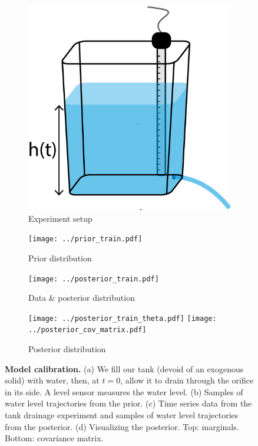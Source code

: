 \documentclass[openacc]{rsproca_new}%
\begin{document}
\begin{figure}[!ht]
    \centering
        \begin{subfigure}[b]{0.225\textwidth}
    	\includegraphics[width=\textwidth]{../tank_geometry/naked_tank.pdf}
	\caption{Experiment setup} \label{fig:naked_tank}
    \end{subfigure}
    
     \begin{subfigure}[b]{0.4\textwidth}
    	\texttt{[image: ../prior\_train.pdf]}
	\caption{Prior distribution} \label{fig:prior_train}
    \end{subfigure}
     \begin{subfigure}[b]{0.4\textwidth}
    	\texttt{[image: ../posterior\_train.pdf]}
	\caption{Data \& posterior distribution} \label{fig:posterior_train}
    \end{subfigure}
    
     \begin{subfigure}[b]{\textwidth}
     \center
    	\texttt{[image: ../posterior\_train\_theta.pdf]}
	\texttt{[image: ../posterior\_cov\_matrix.pdf]}
	\caption{Posterior distribution} \label{fig:posterior_train_theta}
    \end{subfigure}
    \caption{
      \textbf{Model calibration.}
      (a) We fill our tank (devoid of an exogenous solid) with water, then, at $t=0$, allow it to drain through the orifice in its side. A level sensor measures the water level.     
      (b) Samples of water level trajectories from the prior.
      (c) Time series data from the tank drainage experiment and samples of water level trajectories from the posterior.
       (d) Visualizing the posterior. Top: marginals. Bottom: covariance matrix.      
      }
\end{figure}
\end{document}
